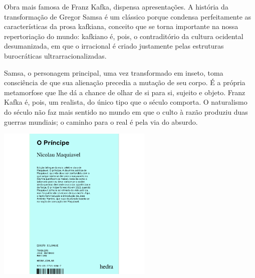 \hspace*{-7cm}\hrulefill\hspace*{-7cm}

\medskip

\noindent{}Obra mais famosa de Franz Kafka, {} dispensa apresentações. A história da transformação de Gregor Samsa é um clássico porque condensa perfeitamente as características da prosa kafkiana, conceito que se torna importante na nossa repertoriação do mundo: kafkiano é, pois, o contraditório da cultura ocidental desumanizada, em que o irracional é criado justamente pelas estruturas burocráticas ultrarracionalizadas.

Samsa, o personagem principal, uma vez transformado em inseto, toma consciência de que sua alienação precedia a mutação de seu corpo. É a própria metamorfose que lhe dá a chance de olhar de si para si, sujeito e objeto. Franz Kafka é, pois, um realista, do único tipo que o século  comporta. O naturalismo do século  não faz mais sentido no mundo em que o culto à razão produziu duas guerras mundiais; o caminho para o real é pela via do absurdo.


\vfill

\hspace*{-.4cm}\begin{minipage}[c]{.5\linewidth}
\small{
{}}
\end{minipage}


\pagebreak %

\begin{center}
\hspace*{.5cm}\includegraphics[width=74mm]{./grid/maquiavel.jpg}
\end{center}

